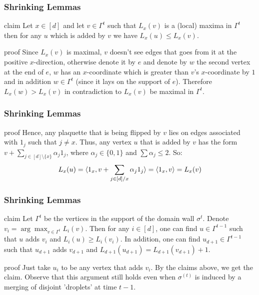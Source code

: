 \documentclass{beamer}
\begin{document}
\begin{frame}
  \frametitle{Shrinking Lemmas} 


\begin{block}{claim}
  \label{claim:toomc}
  Let $x \in [d]$ and let $v \in \Gamma^{t}$ such that $L_{x}(v)$ is a (local) maxima in $\Gamma^{t}$ then for any $u$ which is added by $v$ we have $L_{x}(u) \le L_{x}(v)$. 
\end{block}


\begin{block}{proof}
  Since $L_{x}(v)$ is maximal, $v$ doesn't see edges that goes from it at the positive $x$-direction, otherwise denote it by $e$ and denote by $w$ the second vertex at the end of $e$, $w$ has an $x$-coordinate which is greater than $v$'s $x$-coordinate by $1$ and in addition $w \in \Gamma^{t}$ (since it lays on the support of $e$). Therefore $L_{x}(w) > L_{x}(v)$ in contradiction to $L_{x}(v)$ be maximal in $\Gamma^{t}$. 

\end{block}
\end{frame}



\begin{frame}
  \frametitle{Shrinking Lemmas} 


\begin{block}{proof}
Hence, any plaquette that is being flipped by $v$ lies on edges associated with $1_{j}$ such that $j \neq x$. Thus, any vertex $u$ that is added by $v$ has the form $v + \sum_{j \in [d] \setminus \{x\}} \alpha_{j}1_{j}$, where $\alpha_{j} \in \{0,1\}$ and $\sum \alpha_j \le 2$. So:
  \begin{equation*}
    \begin{split}
      L_{x}(u) = \braket{1_{x}, v + \sum_{j \in [d]/x} \alpha_{j}1_{j}} = \braket{1_{x},v} = L_{x}(v) 
    \end{split}
  \end{equation*}
\end{block}



\end{frame}

\begin{frame}
  \frametitle{Shrinking Lemmas} 


\begin{block}{claim}
Let $\Gamma^{t}$ be the vertices in the support of the domain wall $\sigma^{t}$. Denote $v_i = \arg \max_{v \in \Gamma^{t}} L_{i}(v)$. Then for any $i \in [d]$, one can find $u \in \Gamma^{t-1}$ such that $u$ adds $v_i$ and $L_{i}(u) \ge L_{i}(v_{i})$. In addition, one can find $u_{d+1} \in \Gamma^{t-1}$ such that $u_{d+1}$ adds $v_{d+1}$ and $L_{d+1}(u_{d+1}) = L_{d+1}(v_{d+1}) + 1$. 
\end{block}

\begin{block}{proof}
  Just take $u_{i}$ to be any vertex that adds $v_{i}$. By the claims above, we get the claim. Observe that this argument still holds even when $\sigma^{(t)}$ is induced by a merging of disjoint 'droplets' at time $t-1$.
\end{block}

\end{frame}
\end{document}
